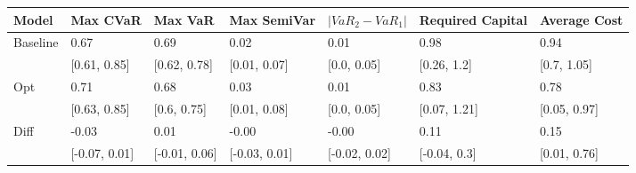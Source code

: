 \begin{tabular}{lllllll}
\toprule
   Model &      Max CVaR &       Max VaR &   Max SemiVar & $|VaR_2 - VaR_1|$ & Required Capital & Average Cost \\
\midrule
Baseline &          0.67 &          0.69 &          0.02 &              0.01 &             0.98 &         0.94 \\
         &  [0.61, 0.85] &  [0.62, 0.78] &  [0.01, 0.07] &       [0.0, 0.05] &      [0.26, 1.2] &  [0.7, 1.05] \\
     Opt &          0.71 &          0.68 &          0.03 &              0.01 &             0.83 &         0.78 \\
         &  [0.63, 0.85] &   [0.6, 0.75] &  [0.01, 0.08] &       [0.0, 0.05] &     [0.07, 1.21] & [0.05, 0.97] \\
    Diff &         -0.03 &          0.01 &         -0.00 &             -0.00 &             0.11 &         0.15 \\
         & [-0.07, 0.01] & [-0.01, 0.06] & [-0.03, 0.01] &     [-0.02, 0.02] &     [-0.04, 0.3] & [0.01, 0.76] \\
\bottomrule
\end{tabular}

